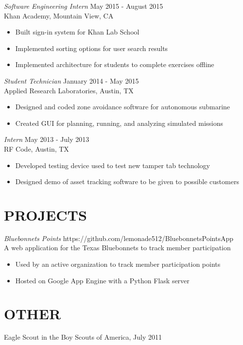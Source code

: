 \documentclass[margin,10pt]{res}
\begin{document}
\begin{resume}
    {\sl Software Engineering Intern} \hfill   May 2015 - August 2015 \\
    Khan Academy, Mountain View, CA
    \begin{itemize} \itemsep -2pt %
        \item Built sign-in system for Khan Lab School
        \item Implemented sorting options for user search results
        \item Implemented architecture for students to complete exercises offline
    \end{itemize}

    {\sl Student Technician} \hfill            January 2014 - May 2015 \\
    Applied Research Laboratories, Austin, TX
    \begin{itemize}  \itemsep -2pt %
        \item Designed and coded zone avoidance software for autonomous submarine
        \item Created GUI for planning, running, and analyzing simulated missions
    \end{itemize}

    {\sl Intern} \hfill May 2013 - July 2013 \\
    RF Code, Austin, TX
    \begin{itemize}  \itemsep -2pt %
        \item Developed testing device used to test new tamper tab technology
        \item Designed demo of asset tracking software to be given to possible customers
    \end{itemize}

\section{PROJECTS}
    {\sl Bluebonnets Points} \hfill https://github.com/lemonade512/BluebonnetsPointsApp \\
    A web application for the Texas Bluebonnets to track member participation
    \begin{itemize} \itemsep -2pt
        \item Used by an active organization to track member participation points
        \item Hosted on Google App Engine with a Python Flask server
    \end{itemize}

\section{OTHER}
    Eagle Scout in the Boy Scouts of America, July 2011 \\


\end{resume}
\end{document}
